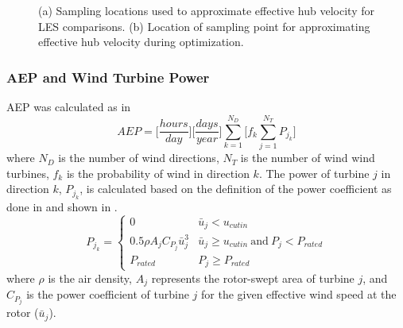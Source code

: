 \documentclass[conf]{new-aiaa}
\begin{document}
\begin{figure}[ht]
	\centering
	\caption{(a) Sampling locations used to approximate effective hub velocity for LES comparisons. (b) Location of sampling point for approximating effective hub velocity during optimization.}
	\label{fig:sampling_locs}
\end{figure}

\subsubsection{AEP and Wind Turbine Power}
AEP was calculated as in 
\begin{equation}
    \label{eq:aep}
    AEP = \bigg[\frac{hours}{day}\bigg]\bigg[\frac{days}{year} \bigg]\sum_{k=1}^{N_D} \bigg[ f_k \sum_{j=1}^{N_T}P_{j_k} \bigg]
\end{equation}
%
where $N_D$ is the number of wind directions, $N_T$ is the number of wind wind turbines, $f_k$ is the probability of wind in direction $k$. The power of turbine $j$ in direction $k$, $P_{j_k}$, is calculated based on the definition of the power coefficient as done in \cite{gebraad2014} and shown in .
%
\begin{equation}\label{eq:power}
    P_{j_k} = 
    \begin{cases} 
      0 & \bar{u}_j < u_{cutin} \\
      0.5\rho A_j C_{P_j}\bar{u}_j^3 & \bar{u}_j \geq  u_{cutin} \ \text{and} \ P_{j} < P_{rated} \\
      P_{rated} & P_{j} \geq P_{rated}
\end{cases}
\end{equation}
%
where $\rho$ is the air density, $A_j$ represents the rotor-swept area of turbine $j$, and $C_{P_j}$ is the power coefficient of turbine $j$ for the given effective wind speed at the rotor ($\bar{u}_j$).
\end{document}

